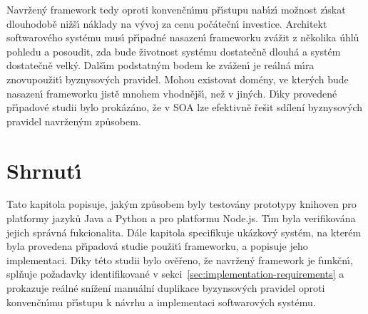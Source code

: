 Navržen\'y framework tedy oproti konvenčn\'{\i}mu př\'{\i}stupu nab\'{\i}z\'{\i} možnost z\'{\i}skat dlouhodobě
nižš\'{\i} náklady na v\'yvoj za cenu počátečn\'{\i} investice. Architekt softwarového systému mus\'{\i} př\'{\i}padné nasazen\'{\i}
frameworku zvážit z několika úhlů pohledu a posoudit, zda bude životnost systému dostatečně dlouhá a systém
dostatečně velk\'y. Dalš\'{\i}m podstatn\'ym bodem ke zvážen\'{\i} je reálná m\'{\i}ra znovupoužit\'{\i} byznysov\'ych pravidel.
Mohou existovat domény, ve kter\'ych bude nasazen\'{\i} frameworku jistě mnohem vhodnějš\'{\i}, než v jin\'ych.
D\'{\i}ky provedené př\'{\i}padové studii bylo prokázáno, že v \gls{SOA} lze efektivně řešit sdílení byznysov\'ych pravidel
navržen\'ym způsobem.

\section{Shrnut\'{\i}}

Tato kapitola popisuje, jak\'ym způsobem byly testovány prototypy knihoven
pro platformy jazyků Java a Python a pro platformu Node.js. T\'{\i}m byla verifikována
jejich správná fukcionalita. Dále kapitola specifikuje ukázkový systém, na kterém byla
provedena př\'{\i}padová studie použit\'{\i} frameworku, a popisuje jeho implementaci.
D\'{\i}ky této studii bylo ověřeno, že navržen\'y framework je funkčn\'{\i},
splňuje požadavky identifikované v sekci~\ref{sec:implementation-requirements}
a prokazuje reálné snížení manuální duplikace byzynsových pravidel oproti
konvenčn\'{\i}mu př\'{\i}stupu k návrhu a implementaci softwarov\'ych systému.
